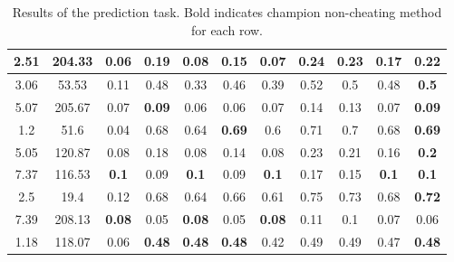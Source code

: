 \begin{table}
{\begin{tabular}{|c|c|c|c|c|c|c|c|c|c|c|}
 \hline 
2.51  &204.33  &0.06  &0.19  &0.08  &0.15  &0.07  &0.24  &0.23  &0.17  &\textbf{0.22}
  \\
 \hline 
3.06  &53.53  &0.11  &0.48  &0.33  &0.46  &0.39  &0.52  &0.5  &0.48  &\textbf{0.5}
  \\
 \hline 
5.07  &205.67  &0.07  &\textbf{0.09}
  &0.06  &0.06  &0.07  &0.14  &0.13  &0.07  &\textbf{0.09}
  \\
 \hline 
1.2  &51.6  &0.04  &0.68  &0.64  &\textbf{0.69}
  &0.6  &0.71  &0.7  &0.68  &\textbf{0.69}
  \\
 \hline 
5.05  &120.87  &0.08  &0.18  &0.08  &0.14  &0.08  &0.23  &0.21  &0.16  &\textbf{0.2}
  \\
 \hline 
7.37  &116.53  &\textbf{0.1}
  &0.09  &\textbf{0.1}
  &0.09  &\textbf{0.1}
  &0.17  &0.15  &\textbf{0.1}
  &\textbf{0.1}
  \\
 \hline 
2.5  &19.4  &0.12  &0.68  &0.64  &0.66  &0.61  &0.75  &0.73  &0.68  &\textbf{0.72}
  \\
 \hline 
7.39  &208.13  &\textbf{0.08}
  &0.05  &\textbf{0.08}
  &0.05  &\textbf{0.08}
  &0.11  &0.1  &0.07  &0.06  \\
 \hline 
1.18  &118.07  &0.06  &\textbf{0.48}
  &\textbf{0.48}
  &\textbf{0.48}
  &0.42  &0.49  &0.49  &0.47  &\textbf{0.48}
  \\
 \hline 

\end{tabular}

}
\caption{Results of the prediction task. Bold indicates champion non-cheating method for each row.}

\label{tab:overall}
\end{table}

